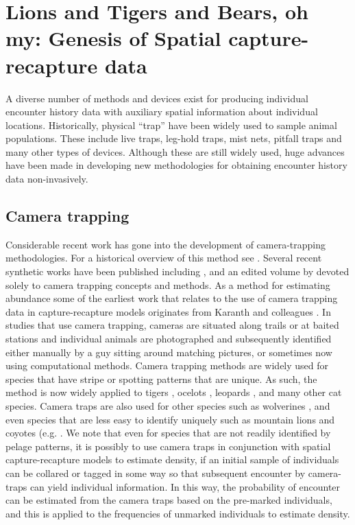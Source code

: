 \section{Lions and Tigers and Bears, oh my:  Genesis of
Spatial capture-recapture data}

A diverse number of methods and devices exist for producing individual
encounter history data with auxiliary spatial information about
individual locations. Historically, physical ``trap'' have been widely
used to sample animal populations. These include live traps, leg-hold
traps, mist nets, pitfall traps and many other types of
devices. Although these are still widely used, huge advances have been
made in developing new methodologies for obtaining encounter history
data non-invasively.

\subsection{Camera trapping}

Considerable recent work has gone into the development of
camera-trapping methodologies. For a historical overview of this
method see \citet{kays_etal:2008, kucera_barrett:2011}.  Several
recent synthetic works have been published including
\citet{nichols_karanth:2002}, and an edited volume by
\citet{oconnell_etal:2010} devoted solely to camera trapping concepts
and methods. As a method for estimating abundance some of the earliest
work that relates to the use of camera trapping data in
capture-recapture models originates from Karanth and colleagues
\citep{karanth:1995, karanth_nichols:1998, karanth_nichols:2000}. In
studies that use camera trapping, cameras are situated along trails or
at baited stations and individual animals are photographed and
subsequently identified either manually by a guy sitting around
matching pictures, or sometimes now using computational
methods. Camera trapping methods are widely used for species that have
stripe or spotting patterns that are unique. As such, the method is
now widely applied to tigers \citep{karanth:1995,
  karanth_nichols:1998}, ocelots
\citep{trolle_kery:2003,trolle_kery:2005}, leopards
\citep{balme_etal:2010}, and many other cat species. Camera traps are
also used for other species such as wolverines
\citep{magoun_etal:2011}, and even species that are less easy to
identify uniquely such as mountain lions and coyotes
(e.g. \citet{kelly_etal:2008}.  We note that even for species that are
not readily identified by pelage patterns, it is possibly to use
camera traps in conjunction with spatial capture-recapture models to
estimate density, if an initial sample of individuals can be collared
or tagged in some way so that subsequent encounter by camera-traps can
yield individual information. In this way, the probability of
encounter can be estimated from the camera traps based on the
pre-marked individuals, and this is applied to the frequencies of
unmarked individuals to estimate density.


